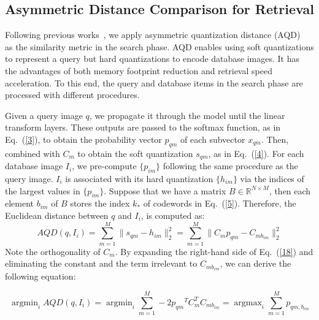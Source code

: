 \documentclass{elsarticle}
\DeclareMathOperator*{\argmax}{argmax}
\DeclareMathOperator*{\argmin}{argmin}
\begin{document}
\subsection{Asymmetric Distance Comparison for Retrieval} \label{adc}
Following previous works~\cite{yu2018product,klein2019end,yu2020product,jang2020generalized}, we apply asymmetric quantization distance (AQD)~\cite{jegou2010product} as the similarity metric in the search phase. AQD enables using soft quantizations to represent a query but hard quantizations to encode database images. It has the advantages of both memory footprint reduction and retrieval speed acceleration. To this end, the query and database items in the search phase are processed with different procedures. 

Given a query image $q$, we propagate it through the model until the linear transform layers. These outputs are passed to the softmax function, as in Eq.~(\ref{3}), to obtain the probability vector $p_{qm}$ of each subvector $x_{qm}$. Then, combined with $C_{m}$ to obtain the soft quantization $s_{qm}$, as in Eq.~(\ref{4}). For each database image $I_{i}$, we pre-compute $\{p_{im}\}$ following the same procedure as the query image. $I_i$ is associated with its hard quantization $\{h_{im}\}$ via the indices of the largest values in $\{p_{im}\}$. Suppose that we have a matrix $B \in \mathbb{R}^{N \times M}$, then each element $b_{im}$ of $B$ stores the index $k_*$ of codewords in Eq.~(\ref{5}). Therefore, the Euclidean distance between $q$ and $I_i$, is computed as:
\begin{equation} \label{18}
     AQD(q, I_{i}) = \sum_{m=1}^M \|s_{qm} - h_{im}\|_2^2 = \sum_{m=1}^M \|C_m p_{qm} - C_{mb_{im}}\|_2^2
\end{equation}
Note the orthogonality of $C_{m}$. By expanding the right-hand side of Eq.~(\ref{18}) and eliminating the constant and the term irrelevant to $C_{mb_{im}}$, we can derive the following equation:

\begin{equation} \label{20}
    \argmin_{i} AQD(q, I_{i}) = \argmin_{i} \sum_{m=1}^M - 2{p_{qm}}^T C_m^T C_{mb_{im}} = \argmax_{i} \sum_{m=1}^M p_{qm,b_{im}}
\end{equation}
\end{document}
